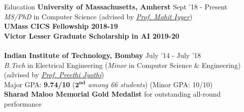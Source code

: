 \documentclass{resume} %
\begin{document}
\vspace*{-1mm}
\begin{rSection}{Education}
{\bf University of Massachusetts, Amherst} \hfill {Sept '18 - Present} \\ \textit{MS/PhD} in Computer Science (advised by \textit{\href{https://people.cs.umass.edu/~miyyer/}{Prof. Mohit Iyyer}}) \\
\textbf{UMass CICS Fellowship 2018-19}\\
\textbf{Victor Lesser Graduate Scholarship in AI 2019-20}\\\\
{\bf Indian Institute of Technology, Bombay} \hfill {July '14 - July '18} \\ 
\textit{B.Tech} in Electrical Engineering (\textit{Minor} in Computer Science \& Engineering)\\
(advised by \textit{\href{https://www.cse.iitb.ac.in/~pjyothi/}{Prof. Preethi Jyothi}})\\
Major GPA: \textbf{9.74/10} (\textit{$\mathbf{2^{nd}}$ among 66 students}) (Minor GPA: 10/10)\\
\textbf{Sharad Maloo Memorial Gold Medalist} for outstanding all-round performance
\end{rSection}
\vspace*{-1.5mm}
\end{document}
